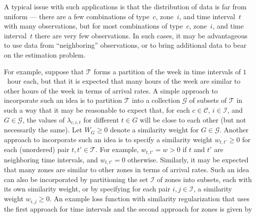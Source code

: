 \documentclass[article]{jss}
\newcommand{\ignore}[1]{}
\def\defi{\vcentcolon=}
\begin{document}
A typical issue with such applications is that the distribution of data is far from uniform --- there are a few combinations of type~$c$, zone~$i$, and time interval~$t$ with many observations, but for most combinations of type~$c$, zone~$i$, and time interval~$t$ there are very few observations.
In such cases, it may be advantageous to use data from ``neighboring'' observations, or to bring additional data to bear on the estimation problem.
\ignore{
If it is required that $\lambda_{c,i,t} = \lambda_{c,i,t'}$ for all $t,t' \in G$ for all $G \in \mathcal{G}$, then let $\lambda_{c,i,G}$ denote the common value of $\lambda_{c,i,t}$ for all $t \in G$.
Then the negative log-likelihood function is given by
\begin{equation}
\label{eqn:maxlikelihood2}
\mathscr{L}(\lambda) \ \ \defi \ \ \displaystyle \sum_{c \in \mathcal{C}} \sum_{i \in \mathcal{I}} \sum_{G \in \mathcal{G}} \left[N_{c,i,G} \lambda_{c,i,G} - \sum_{t \in G} M_{c,i,t} \log\left(\lambda_{c,i,G}\right)\right]
\end{equation}
where $N_{c,i,G} \defi \sum_{t \in G} N_{c,i,t} \mathcal{D}_{t}$.
}
For example, suppose that $\mathcal{T}$ forms a partition of the week in time intervals of $1$~hour each, but that it is expected that many hours of the week are similar to other hours of the week in terms of arrival rates.
A simple approach to incorporate such an idea is to partition $\mathcal{T}$ into a collection $\mathcal{G}$ of subsets of $\mathcal{T}$ in such a way that it may be reasonable to expect that, for each $c \in \mathcal{C}$, $i \in \mathcal{I}$, and $G \in \mathcal{G}$, the values of $\lambda_{c,i,t}$ for different $t \in G$ will be close to each other (but not necessarily the same).
Let $W_{G} \ge 0$ denote a similarity weight for $G \in \mathcal{G}$.
Another approach to incorporate such an idea is to specify a similarity weight $w_{t,t'} \ge 0$ for each (unordered) pair $t,t' \in \mathcal{T}$.
For example, $w_{t,t'} = w > 0$ if $t$ and $t'$ are neighboring time intervals, and $w_{t,t'} = 0$ otherwise.
Similarly, it may be expected that many zones are similar to other zones in terms of arrival rates.
Such an idea can also be incorporated by partitioning the set $\mathcal{I}$ of zones into subsets, each with its own similarity weight, or by specifying for each pair $i,j \in \mathcal{I}$, a similarity weight $w_{i,j} \ge 0$.
An example loss function with similarity regularization that uses the first approach for time intervals and the second approach for zones is given by
\end{document}
